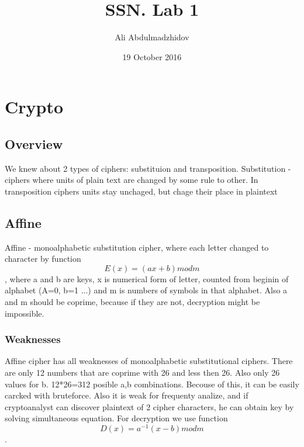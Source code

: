 \documentclass[10pt]{article}
\title{SSN. Lab 1}
\date{19 October 2016}
\author{Ali Abdulmadzhidov}
\begin{document}
\renewcommand*\rmdefault{cmss}
  \maketitle
  \section{Crypto}
  \subsection{Overview}
  We knew about 2 types of ciphers: substituion and transposition. 
  Substitution - ciphers where units of plain text are changed by some rule to other.
  In transposition ciphers units stay unchaged, but chage their place in plaintext
  \subsection{Affine}
  Affine - monoalphabetic substitution cipher, where each letter changed to character by function \begin{equation} E(x) = (ax + b) mod m \end{equation}, where a and b are keys, x is numerical form of letter, counted from beginin of alphabet (A=0, b=1 ...) and m is numbers of symbols in that alphabet. Also a and m should be coprime, because if they are not, decryption might be impossible.
  
  \subsubsection{Weaknesses}

  Affine cipher has all weaknesses of monoalphabetic substitutional ciphers. There are only 12 numbers that are coprime with 26 and less then 26. Also only 26  values for b. 12*26=312 posible a,b combinations. Becouse of this, it can be easily carcked with bruteforce. Also it is weak for frequenty analize, and if cryptoanalyst can discover plaintext of 2 cipher characters, he can obtain key by solving simultaneous equation.
  For decryption we use function \begin{equation} D(x) = a^{-1}(x - b) mod m \end{equation}.
\end{document}
